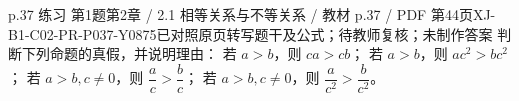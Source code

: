 \par\noindent\begin{minipage}{\linewidth}
\begin{bankitem}{p.37 练习 第1题}{第2章 / 2.1 相等关系与不等关系 / 教材 p.37 / PDF 第44页}{XJ-B1-C02-PR-P037-Y0875}{已对照原页转写题干及公式；待教师复核；未制作答案}
判断下列命题的真假，并说明理由：
若 $a>b$，则 $ca>cb$；
若 $a>b$，则 $ac^2>bc^2$；
若 $a>b,c\ne0$，则 $\dfrac ac>\dfrac bc$；
若 $a>b,c\ne0$，则 $\dfrac a{c^2}>\dfrac b{c^2}$。
\end{bankitem}
\end{minipage}\par\medskip
